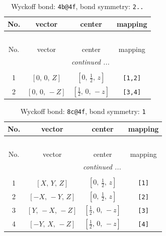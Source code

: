 \documentclass[fleqn,8pt]{jsarticle}
\begin{document}
\renewcommand{\arraystretch}{1.2}
\begin{longtable}{cccc}
\caption{Wyckoff bond: {\tt 4b@4f}, bond symmetry: {\tt 2..}}
 \\
 \hline \hline
No. & vector & center & mapping \\ \hline \endfirsthead

\multicolumn{3}{l}{\tablename\ \thetable{}} \\
 \hline \hline
No. & vector & center & mapping \\ \hline \endhead

 \hline \hline
\multicolumn{3}{r}{\footnotesize\it continued ...} \\ \endfoot

 \hline \hline
\multicolumn{3}{r}{} \\ \endlastfoot

1 & $\left[ 0,\, 0,\, Z \right]$ & $\left[ 0,\, \frac{1}{2},\, z \right]$ & {\tt [1,2]} \\ \hline
2 & $\left[ 0,\, 0,\, - Z \right]$ & $\left[ \frac{1}{2},\, 0,\, - z \right]$ & {\tt [3,4]} \\
\end{longtable}
\renewcommand{\arraystretch}{1.2}
\begin{longtable}{cccc}
\caption{Wyckoff bond: {\tt 8c@4f}, bond symmetry: {\tt 1}}
 \\
 \hline \hline
No. & vector & center & mapping \\ \hline \endfirsthead

\multicolumn{3}{l}{\tablename\ \thetable{}} \\
 \hline \hline
No. & vector & center & mapping \\ \hline \endhead

 \hline \hline
\multicolumn{3}{r}{\footnotesize\it continued ...} \\ \endfoot

 \hline \hline
\multicolumn{3}{r}{} \\ \endlastfoot

1 & $\left[ X,\, Y,\, Z \right]$ & $\left[ 0,\, \frac{1}{2},\, z \right]$ & {\tt [1]} \\ \hline
2 & $\left[ - X,\, - Y,\, Z \right]$ & $\left[ 0,\, \frac{1}{2},\, z \right]$ & {\tt [2]} \\ \hline
3 & $\left[ Y,\, - X,\, - Z \right]$ & $\left[ \frac{1}{2},\, 0,\, - z \right]$ & {\tt [3]} \\ \hline
4 & $\left[ - Y,\, X,\, - Z \right]$ & $\left[ \frac{1}{2},\, 0,\, - z \right]$ & {\tt [4]} \\
\end{longtable}
\end{document}
